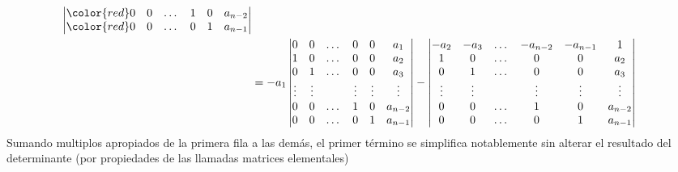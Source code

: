 \documentclass{report}
\theoremstyle{definition}
\theoremstyle{remark}
\begin{document}
\begin{align}
\begin{vmatrix}
        \color{red} 0
        &0
        &\dots
        &1
        &0
        &a_{n - 2}
        \\
        \color{red} 0
        &0
        &\dots
        &0
        &1
        &a_{n - 1}
      \end{vmatrix}
      \\
    &=
    - a_1
    \begin{vmatrix}
      0
      &0
      &\dots
      &0
      &0
      &a_1
      \\
      1
      &0
      &\dots
      &0
      &0
      &a_2
      \\
      0
      &1
      &\dots
      &0
      &0
      &a_3
      \\
      \vdots
      &\vdots
      &
      &\vdots
      &\vdots
      &\vdots
      \\
      0
      &0
      &\dots
      &1
      &0
      &a_{n - 2}
      \\
      0
      &0
      &\dots
      &0
      &1
      &a_{n - 1}
    \end{vmatrix}
    -
    \begin{vmatrix}
      - a_2
      &- a_3
      &\dots
      &- a_{n - 2}
      &- a_{n - 1}
      &1
      \\
      1
      &0
      &\dots
      &0
      &0
      &a_2
      \\
      0
      &1
      &\dots
      &0
      &0
      &a_3
      \\
      \vdots
      &\vdots
      &
      &\vdots
      &\vdots
      &\vdots
      \\
      0
      &0
      &\dots
      &1
      &0
      &a_{n - 2}
      \\
      0
      &0
      &\dots
      &0
      &1
      &a_{n - 1}
    \end{vmatrix}
  \end{align}
  \endgroup
  Sumando multiplos apropiados de la primera fila a las demás, el primer término se simplifica notablemente sin alterar el resultado del determinante (por propiedades de las llamadas matrices elementales)
\end{document}
